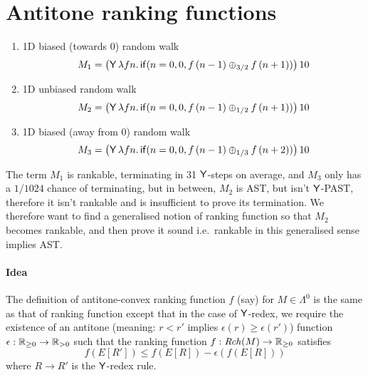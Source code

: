\section{Antitone ranking functions}
\label{sec:antitone}

\begin{example}
\label{ex:ac-ranking}
\begin{enumerate}
\item 1D biased (towards 0) random walk
\[
M_1 = 
\big(\mathsf{Y} \, \lambda f n . \, 
\mathsf{if}(n = 0, 0, f \, (n - 1) \oplus_{3/2} f \, (n + 1))\big) \, 10
\]

\item 1D unbiased random walk
\[
M_2 = 
\big(\mathsf{Y} \, \lambda f n . \, 
\mathsf{if}(n = 0, 0, f \, (n - 1) \oplus_{1/2} f \, (n + 1))\big) \, 10
\]

\item 1D biased (away from 0) random walk
\[
M_3 = 
\big(\mathsf{Y} \, \lambda f n . \, 
\mathsf{if}(n = 0, 0, f \, (n - 1) \oplus_{1/3} f \, (n + 2))\big) \, 10
\]



\end{enumerate}
\end{example}

The term $M_1$ is rankable, terminating in 31 $\mathsf{Y}$-steps on average, and $M_3$ only has a $1/1024$ chance of terminating, but in between, $M_2$ is AST, but isn't $\mathsf{Y}$-PAST, therefore it isn't rankable and  is insufficient to prove its termination. We therefore want to find a generalised notion of ranking function so that $M_2$ becomes rankable, and then prove it sound i.e.~rankable in this generalised sense implies AST.

\paragraph*{Idea} 

The definition of antitone-convex ranking function $f$ (say) for $M \in \Lambda^0$ is the same as that of ranking function except that in the case of $\mathsf{Y}$-redex, 
we require the existence of an antitone (meaning: $r < r'$ implies $\epsilon(r) \geq \epsilon(r')$) function $\epsilon : \mathbb{R}_{{\geq}0} \to \mathbb{R}_{{>}0}$ such that the ranking function $f :\mathit{Rch}(M) \to \mathbb{R}_{{\geq}0}$ satisfies
\[
f(E[R']) \leq f(E[R]) - \epsilon(f(E[R])) 
\]
where $R \to R'$ is the $\mathsf{Y}$-redex rule.

